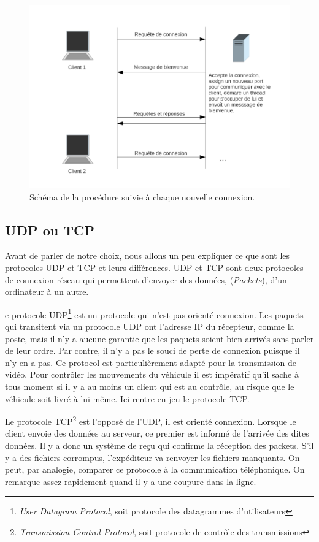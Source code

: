 \documentclass[a4paper,11pt]{report}
\begin{document}
{\begin{figure}[h]
\includegraphics[width=1.0\textwidth]{figures/Client_Server2.pdf}
\caption[Connexion d'un nouveau client]{\label{ClientServer2}Schéma de la procédure suivie à chaque nouvelle connexion.}
\end{figure}


\subsection{UDP ou TCP\label{UDPTCP}}
Avant de parler de notre choix, nous allons un peu expliquer ce que sont les protocoles UDP et TCP et leurs différences. UDP et TCP sont deux protocoles de connexion réseau qui permettent d'envoyer des données, (\textit{Packets}), d'un ordinateur à un autre.

e protocole UDP\footnote{\textit{User Datagram Protocol}, soit protocole des datagrammes d'utilisateurs} est un protocole qui n'est pas orienté connexion. Les paquets qui transitent via un protocole UDP ont l'adresse IP du récepteur, comme la poste, mais il n'y a aucune garantie que les paquets soient bien arrivés sans parler de leur ordre. Par contre, il n'y a pas le souci de perte de connexion puisque il n'y en a pas. Ce protocol est particulièrement adapté pour la transmission de vidéo. Pour contrôler les mouvements du véhicule il est impératif qu'il sache à tous moment si il y a au moins un client qui est au contrôle, au risque que le véhicule soit livré à lui même. Ici rentre en jeu le protocole TCP. 

Le protocole TCP\footnote{\textit{Transmission Control Protocol}, soit protocole de contrôle des transmissions} est l'opposé de l'UDP, il est orienté connexion. Lorsque le client envoie des données au serveur, ce premier est informé de l'arrivée des dites données. Il y a donc un système de reçu qui confirme la réception des packets. S'il y a des fichiers corrompus, l'expéditeur va renvoyer les fichiers manquants. On peut, par analogie, comparer ce protocole à la communication téléphonique. On remarque assez rapidement quand il y a une coupure dans la ligne.\\

}
\end{document}
